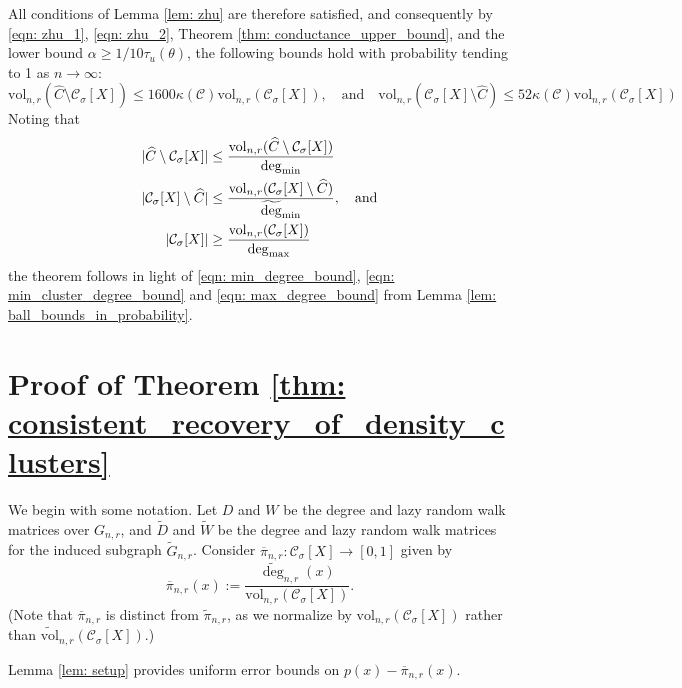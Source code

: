 \documentclass[11pt,twoside]{article}
\DeclarePairedDelimiter\abs{\lvert}{\rvert}
\newcommand{\vol}{\mathrm{vol}}
\newcommand{\1}{\mathbf{1}}
\newcommand{\pbf}{p}        %
\newcommand{\pibf}{\pi}
\newcommand{\Xbf}{X}             %
\newcommand{\Wbf}{W}
\newcommand{\Dbf}{D}
\newcommand{\Cset}{\mathcal{C}}
\newcommand{\Csig}{\Cset_{\sigma}}
\newcommand{\degminwt}{\widetilde{\deg}_{\min}}
\newcommand{\degmax}{\deg_{\max}}
\newcommand{\degmin}{\deg_{\min}}
\begin{document}
All conditions of Lemma \ref{lem: zhu} are therefore satisfied, and consequently by \eqref{eqn: zhu_1}, \eqref{eqn: zhu_2}, Theorem \ref{thm: conductance_upper_bound}, and the lower bound $\alpha \geq 1/10\tau_u(\theta)$, the following bounds hold with probability tending to 1 as $n \to \infty$:
\begin{equation*}
\vol_{n,r}(\widehat{C} \setminus \Csig[\Xbf]) \leq 1600 \kappa(\Cset) \vol_{n,r}(\Csig[\Xbf]), \quad \textrm{and} \quad  \vol_{n,r}(\Csig[\Xbf] \setminus \widehat{C}) \leq 52 \kappa(\Cset) \vol_{n,r}(\Csig[\Xbf])
\end{equation*}
Noting that
\begin{align*}
\abs{\widehat{C} \setminus \Csig[\Xbf]} & \leq \frac{\vol_{n,r}(\widehat{C} \setminus \Csig[\Xbf])}{\degmin}   \\
\abs{\Csig[\Xbf] \setminus \widehat{C}} & \leq \frac{\vol_{n,r}(\Csig[\Xbf] \setminus \widehat{C})}{\degminwt}, \quad \textrm{and} \\
\abs{\Csig[\Xbf]} & \geq \frac{\vol_{n,r}(\Csig[\Xbf])}{\degmax}
\end{align*}
the theorem follows in light of \eqref{eqn: min_degree_bound}, \eqref{eqn: min_cluster_degree_bound} and \eqref{eqn: max_degree_bound} from Lemma \ref{lem: ball_bounds_in_probability}.



\section{Proof of Theorem \ref{thm: consistent_recovery_of_density_clusters}}
\label{sec: proof_of_consistent_cluster_recovery}

We begin with some notation. Let $\Dbf$ and $\Wbf$ be the degree and lazy random walk matrices over $G_{n,r}$, and $\widetilde{\Dbf}$ and $\widetilde{\Wbf}$ be the degree and lazy random walk matrices for the induced subgraph $\widetilde{G}_{n,r}$. Consider $\overline{\pibf}_{n,r}: \Csig[\Xbf] \to [0,1]$ given by
\begin{equation*}
\overline{\pibf}_{n,r}(x) := \frac{\widetilde{\deg}_{n,r}(x)}{\vol_{n,r}(\Csig[\Xbf])}.
\end{equation*}
(Note that $\overline{\pibf}_{n,r}$ is distinct from $\widetilde{\pibf}_{n,r}$, as we normalize by $\vol_{n,r}(\Csig[\Xbf])$ rather than $\widetilde{\vol}_{n,r}(\Csig[\Xbf])$.)

Lemma \ref{lem: setup} provides uniform error bounds on $\pbf(x) - \overline{\pibf}_{n,r}(x)$. 
\end{document}
